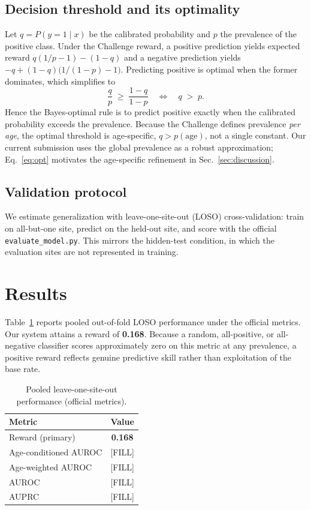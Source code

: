 \documentclass{cinc}
\begin{document}
\subsection{Decision threshold and its optimality}
\label{sec:threshold}
Let $q=P(y=1\mid x)$ be the calibrated probability and $p$ the prevalence of
the positive class. Under the Challenge reward, a positive prediction yields
expected reward $q(1/p-1)-(1-q)$ and a negative prediction yields
$-q+(1-q)\bigl(1/(1-p)-1\bigr)$. Predicting positive is optimal when the
former dominates, which simplifies to
\begin{equation}
\frac{q}{p} \;\ge\; \frac{1-q}{1-p}
\quad\Longleftrightarrow\quad
q \;>\; p .
\label{eq:opt}
\end{equation}
Hence the Bayes-optimal rule is to predict positive exactly when the
calibrated probability exceeds the prevalence. Because the Challenge defines
prevalence \emph{per age}, the optimal threshold is age-specific,
$q>p(\text{age})$, not a single constant. Our current submission uses the
global prevalence as a robust approximation; Eq.~\eqref{eq:opt} motivates the
age-specific refinement in Sec.~\ref{sec:discussion}.

\subsection{Validation protocol}
We estimate generalization with leave-one-site-out (LOSO) cross-validation:
train on all-but-one site, predict on the held-out site, and score with the
official \texttt{evaluate\_model.py}. This mirrors the hidden-test condition,
in which the evaluation sites are not represented in training.

\section{Results}
\label{sec:results}

Table~\ref{tab:loso} reports pooled out-of-fold LOSO performance under the
official metrics. Our system attains a reward of \textbf{0.168}. Because a
random, all-positive, or all-negative classifier scores approximately zero on
this metric at any prevalence, a positive reward reflects genuine predictive
skill rather than exploitation of the base rate.

\begin{table}[t]
\centering
\caption{Pooled leave-one-site-out performance (official metrics).}
\label{tab:loso}
\begin{tabular}{lc}
\toprule
Metric & Value \\
\midrule
Reward (primary)        & \textbf{0.168} \\
Age-conditioned AUROC   & [FILL] \\
Age-weighted AUROC      & [FILL] \\
AUROC                   & [FILL] \\
AUPRC                   & [FILL] \\
\bottomrule
\end{tabular}
\end{table}
\end{document}
